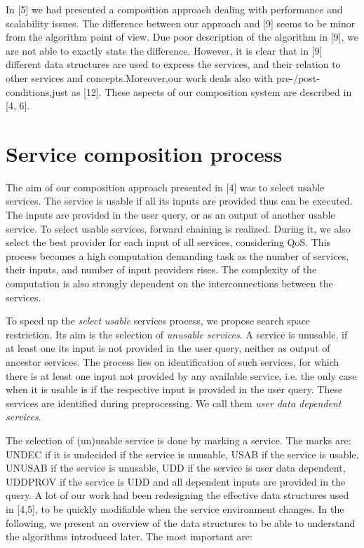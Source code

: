 \documentclass[10pt]{llncs}
\begin{document}
 In [5] we had presented a composition approach dealing with performance and scalability issues. The difference between our approach and [9] seems to be minor from the algorithm point of view. Due poor description of the algorithm in [9], we are not able to exactly state the difference. However, it is clear that in [9] different data structures are used to express the services, and their relation to other services and concepts.Moreover,our work deals also with pre-/post-conditions,just as [12]. These aspects of our composition system are described in [4, 6].

\section{Service composition process}
The aim of our composition approach presented in [4] was to select usable services. The service is usable if all its inputs are provided thus can be executed. The inputs are provided in the user query, or as an output of another usable service. To select usable services, forward chaining is realized. During it, we also select the best provider for each input of all services, considering QoS. This process becomes a high computation demanding task as the number of services, their inputs, and number of input providers rises. The complexity of the computation is also strongly dependent on the interconnections between the services. 

To speed up the \textit{select usable} services process, we propose search space restriction. Its aim is the selection of \textit{unusable services}. A service is unusable, if at least one its input is not provided in the user query, neither as output of ancestor services. The process lies on identiﬁcation of such services, for which there is at least one input not provided by any available service, i.e. the only case when it is usable is if the respective input is provided in the user query. These services are identiﬁed during preprocessing. We call them \textit{user data dependent services}.

 The selection of (un)usable service is done by marking a service. The marks are: UNDEC if it is undecided if the service is unusable, USAB if the service is usable, UNUSAB if the service is unusable, UDD if the service is user data dependent, UDDPROV if the service is UDD and all dependent inputs are provided in the query. A lot of our work had been redesigning the effective data structures used in [4,5], to be quickly modiﬁable when the service environment changes. In the following, we present an overview of the data structures to be able to understand the algorithms introduced later. The most important are:
\end{document}
